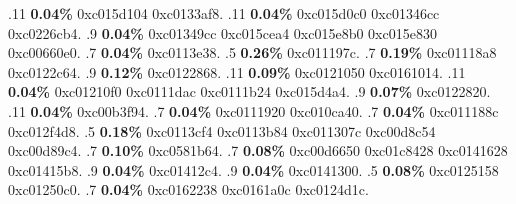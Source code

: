 \begin{profile}
{.11 \textbf{0.04\%} 0xc015d104\newline {} 0xc0133af8. 
.11 \textbf{0.04\%} 0xc015d0c0\newline {} 0xc01346cc\newline {} 0xc0226cb4. 
.9 \textbf{0.04\%} 0xc01349cc\newline {} 0xc015cea4\newline {} 0xc015e8b0\newline {} 0xc015e830\newline {} 0xc00660e0. 
.7 \textbf{0.04\%} 0xc0113e38. 
.5 \textbf{0.26\%} 0xc011197c. 
.7 \textbf{0.19\%} 0xc01118a8\newline {} 0xc0122c64. 
.9 \textbf{0.12\%} 0xc0122868. 
.11 \textbf{0.09\%} 0xc0121050\newline {} 0xc0161014. 
.11 \textbf{0.04\%} 0xc01210f0\newline {} 0xc0111dac\newline {} 0xc0111b24\newline {} 0xc015d4a4. 
.9 \textbf{0.07\%} 0xc0122820. 
.11 \textbf{0.04\%} 0xc00b3f94. 
.7 \textbf{0.04\%} 0xc0111920\newline {} 0xc010ca40. 
.7 \textbf{0.04\%} 0xc011188c\newline {} 0xc012f4d8. 
.5 \textbf{0.18\%} 0xc0113cf4\newline {} 0xc0113b84\newline {} 0xc011307c\newline {} 0xc00d8c54\newline {} 0xc00d89c4. 
.7 \textbf{0.10\%} 0xc0581b64. 
.7 \textbf{0.08\%} 0xc00d6650\newline {} 0xc01c8428\newline {} 0xc0141628\newline {} 0xc01415b8. 
.9 \textbf{0.04\%} 0xc01412c4. 
.9 \textbf{0.04\%} 0xc0141300. 
.5 \textbf{0.08\%} 0xc0125158\newline {} 0xc01250c0. 
.7 \textbf{0.04\%} 0xc0162238\newline {} 0xc0161a0c\newline {} 0xc0124d1c. 
}
\end{profile}

